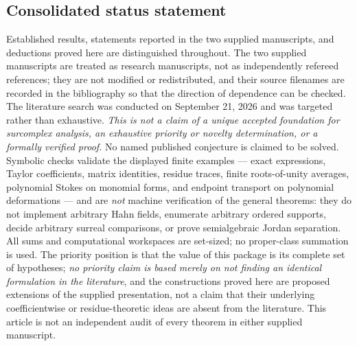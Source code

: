 \documentclass[11pt,letterpaper]{article}
\theoremstyle{definition}
\theoremstyle{remark}
\numberwithin{equation}{section}
\begin{document}
\subsection{Consolidated status statement}
Established results, statements reported in the two supplied manuscripts, and
deductions proved here are distinguished throughout. The two supplied manuscripts
\cite{Analysis,Geometry} are treated as research manuscripts, not as independently
refereed references; they are not modified or redistributed, and their source
filenames are recorded in the bibliography so that the direction of dependence can be
checked. The literature search was conducted on September 21, 2026 and was targeted
rather than exhaustive. \emph{This is not a claim of a unique accepted foundation for
surcomplex analysis, an exhaustive priority or novelty determination, or a formally
verified proof.} No named published conjecture is claimed to be solved. Symbolic
checks validate the displayed finite examples --- exact expressions, Taylor
coefficients, matrix identities, residue traces, finite roots-of-unity averages,
polynomial Stokes on monomial forms, and endpoint transport on polynomial
deformations --- and are \emph{not} machine verification of the general theorems: they
do not implement arbitrary Hahn fields, enumerate arbitrary ordered supports, decide
arbitrary surreal comparisons, or prove semialgebraic Jordan separation. All sums and
computational workspaces are set-sized; no proper-class summation is used. The
priority position is that the value of this package is its complete set of hypotheses;
\emph{no priority claim is based merely on not finding an identical formulation in the
literature}, and the constructions proved here are proposed extensions of the supplied
presentation, not a claim that their underlying coefficientwise or residue-theoretic
ideas are absent from the literature. This article is not an independent audit of
every theorem in either supplied manuscript.
\end{document}
